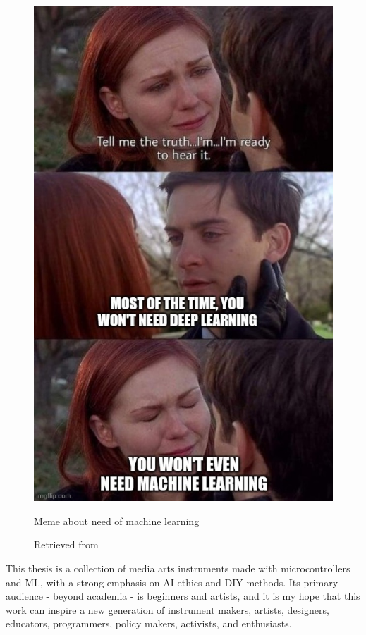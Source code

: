 \begin{figure}[ht]
  \centering
  \includegraphics[width=0.75\linewidth,height=0.50\textheight,keepaspectratio]{images/meme-spider-man.jpg}
  \caption{Meme about need of machine learning}
  \caption*{Retrieved from \cite{website-twitter-dynamicwebpaige-meme}}
  \label{fig:meme-spider-man}
\end{figure}

This thesis is a collection of media arts instruments made with microcontrollers and \acrfull{ML}, with a strong emphasis on \acrfull{AI} ethics and \acrfull{DIY} methods. Its primary audience - beyond academia - is beginners and artists, and it is my hope that this work can inspire a new generation of instrument makers, artists, designers, educators, programmers, policy makers, activists, and enthusiasts.

